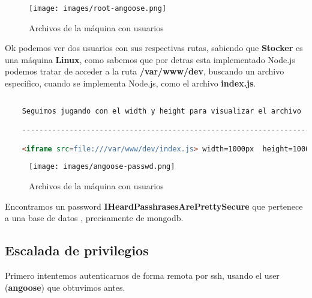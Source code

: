 \documentclass[a4paper]{article} %
\begin{document}
    \begin{figure}[h] %
        \centering
        \texttt{[image: images/root-angoose.png]}
        \caption{Archivos de la máquina con usuarios} %
    \end{figure}\par\vspace{1cm}

    Ok podemos ver dos usuarios con sus respectivas rutas, sabiendo que {\textbf{\color{red}Stocker}} es una máquina \textbf{Linux}, como sabemos que por detras esta implementado Node.js podemos tratar de acceder a la ruta \textbf{/var/www/dev}, buscando un archivo especifico, cuando se implementa Node.js, como el archivo \textbf{index.js}.

    \begin{lstlisting}[language=html, caption=Inyectamos código HTML en BurpSuite para conseguir ver mediante el PDF archivos de la máquina]
    
    Seguimos jugando con el width y height para visualizar el archivo

    -------------------------------------------------------------------------------

    <iframe src=file:///var/www/dev/index.js> width=1000px  height=1000px </iframe>
    \end{lstlisting}

    \begin{figure}[h] %
        \centering
        \texttt{[image: images/angoose-passwd.png]}
        \caption{Archivos de la máquina con usuarios} %
    \end{figure}\par\vspace{10cm}


    Encontramos un password {\textbf{\color{red}IHeardPasshrasesArePrettySecure}} que pertenece a una base de datos , precisamente de mongodb.

    \subsection{Escalada de privilegios}

    Primero intentemos autenticarnos de forma remota por ssh, usando el user (\textbf{angoose}) que obtuvimos antes.
\end{document}

